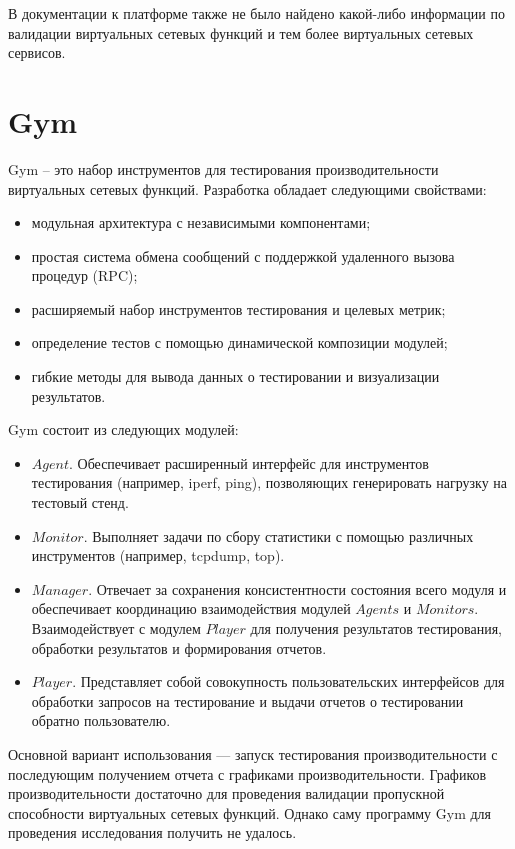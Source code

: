 \documentclass[oneside,final,14pt,a4paper]{extreport}
\begin{document}
В документации к платформе также не было найдено какой-либо информации по валидации виртуальных сетевых функций и тем более виртуальных сетевых сервисов.


\section{Gym}
Gym\cite{bib:gym} -- это набор инструментов для тестирования производительности виртуальных сетевых функций. Разработка обладает следующими свойствами:
\begin{itemize}
    \item модульная архитектура с независимыми компонентами;
    \item простая система обмена сообщений с поддержкой удаленного вызова процедур (RPC);
    \item расширяемый набор инструментов тестирования и целевых метрик;
    \item определение тестов с помощью динамической композиции модулей;
    \item гибкие методы для вывода данных о тестировании и визуализации результатов.
\end{itemize}

Gym состоит из следующих модулей:
\begin{itemize}
    \item $Agent$. Обеспечивает расширенный интерфейс для инструментов тестирования (например, iperf\cite{}, ping\cite{}), позволяющих генерировать нагрузку на тестовый стенд.
    \item $Monitor$. Выполняет задачи по сбору статистики с помощью различных инструментов  (например, tcpdump\cite{}, top\cite{}).
    \item $Manager$. Отвечает за сохранения консистентности состояния всего модуля и обеспечивает координацию взаимодействия модулей $Agents$ и $Monitors$. Взаимодействует с модулем $Player$ для получения результатов тестирования, обработки результатов и формирования отчетов.
    \item $Player$. Представляет собой совокупность пользовательских интерфейсов для обработки запросов на тестирование и выдачи отчетов о тестировании обратно пользователю.
\end{itemize}

Основной вариант использования --- запуск тестирования производительности с последующим получением отчета с графиками производительности. Графиков производительности достаточно для проведения валидации пропускной способности виртуальных сетевых функций. Однако саму программу Gym для проведения исследования получить не удалось.
\end{document}

